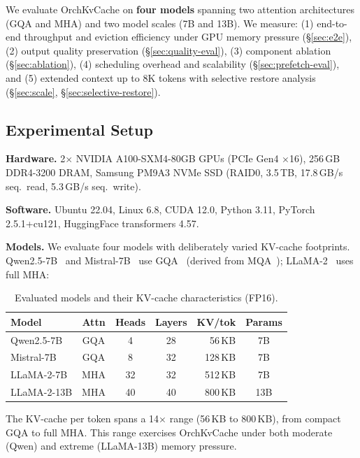 \documentclass[conference]{IEEEtran}
\begin{document}
We evaluate OrchKvCache on \textbf{four models} spanning two attention architectures (GQA and MHA) and two model scales (7B and 13B). We measure: (1) end-to-end throughput and eviction efficiency under GPU memory pressure (\S\ref{sec:e2e}), (2) output quality preservation (\S\ref{sec:quality-eval}), (3) component ablation (\S\ref{sec:ablation}), (4) scheduling overhead and scalability (\S\ref{sec:prefetch-eval}), and (5) extended context up to 8K tokens with selective restore analysis (\S\ref{sec:scale}, \S\ref{sec:selective-restore}).

\subsection{Experimental Setup}

\textbf{Hardware.} 2$\times$ NVIDIA A100-SXM4-80GB GPUs (PCIe Gen4 $\times$16), 256\,GB DDR4-3200 DRAM, Samsung PM9A3 NVMe SSD (RAID0, 3.5\,TB, 17.8\,GB/s seq.\ read, 5.3\,GB/s seq.\ write).

\textbf{Software.} Ubuntu 22.04, Linux 6.8, CUDA 12.0, Python 3.11, PyTorch 2.5.1+cu121, HuggingFace transformers 4.57.

\textbf{Models.} We evaluate four models with deliberately varied KV-cache footprints.  Qwen2.5-7B~\cite{qwen2.5} and Mistral-7B~\cite{mistral} use GQA~\cite{gqa} (derived from MQA~\cite{mqa}); LLaMA-2~\cite{llama2} uses full MHA:

\begin{table}[t]
\centering
\caption{Evaluated models and their KV-cache characteristics (FP16).}
\label{tab:models}
\footnotesize
\setlength{\tabcolsep}{7pt}
\begin{tabular}{@{}lcccrc@{}}
\toprule
Model & Attn & Heads & Layers & KV/tok & Params \\
\midrule
Qwen2.5-7B   & GQA  & 4  & 28 & 56\,KB  & 7B  \\
Mistral-7B   & GQA  & 8  & 32 & 128\,KB & 7B  \\
LLaMA-2-7B   & MHA  & 32 & 32 & 512\,KB & 7B  \\
LLaMA-2-13B  & MHA  & 40 & 40 & 800\,KB & 13B \\
\bottomrule
\end{tabular}
\end{table}

The KV-cache per token spans a 14$\times$ range (56\,KB to 800\,KB), from compact GQA to full MHA. This range exercises OrchKvCache under both moderate (Qwen) and extreme (LLaMA-13B) memory pressure.
\end{document}
